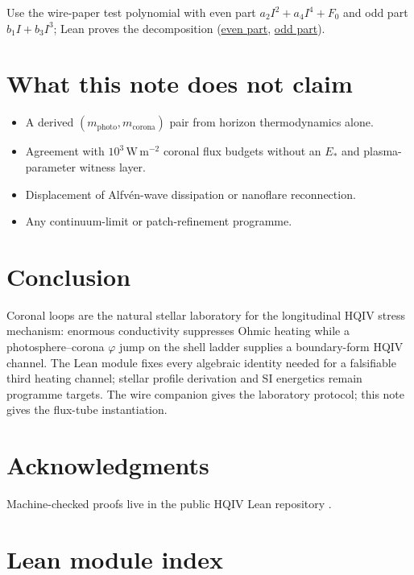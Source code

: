 \documentclass[11pt]{amsart}
\begin{document}
Use the wire-paper test polynomial with even part $a_2 I^2+a_4 I^4+F_0$ and odd
part $b_1 I+b_3 I^3$; Lean proves the decomposition
(\hyperref[lean:test-poly-even]{even part},
\hyperref[lean:test-poly-odd]{odd part}).

\section{What this note does not claim}
\label{sec:not-claimed}

\begin{itemize}[leftmargin=2em]
\item A derived $(m_{\mathrm{photo}},m_{\mathrm{corona}})$ pair from horizon
  thermodynamics alone.
\item Agreement with $10^3\,\mathrm{W\,m^{-2}}$ coronal flux budgets without an
  $E_\ast$ and plasma-parameter witness layer.
\item Displacement of Alfv\'en-wave dissipation or nanoflare reconnection.
\item Any continuum-limit or patch-refinement programme.
\end{itemize}

\section{Conclusion}

Coronal loops are the natural stellar laboratory for the longitudinal HQIV
stress mechanism: enormous conductivity suppresses Ohmic heating while a
photosphere--corona $\varphi$ jump on the shell ladder supplies a boundary-form
HQIV channel. The Lean module fixes every algebraic identity needed for a
falsifiable third heating channel; stellar profile derivation and SI energetics
remain programme targets. The wire companion \cite{ettinger2026longitudinal}
gives the laboratory protocol; this note gives the flux-tube instantiation.

\section*{Acknowledgments}

Machine-checked proofs live in the public HQIV Lean repository \cite{hqiv-lean}.

\appendix

\section{Lean module index}
\label{app:lean-index}
\end{document}
